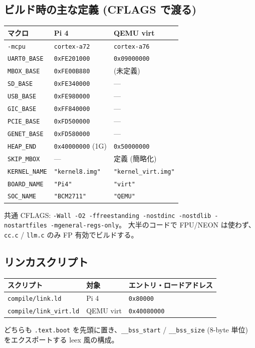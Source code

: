 \documentclass[a4paper,11pt]{ltjsarticle}
\begin{document}
\subsection{ビルド時の主な定義 (CFLAGS で渡る)}
\begin{center}\footnotesize
\begin{tabular}{@{}l l l@{}}
\toprule
\textbf{マクロ} & \textbf{Pi 4} & \textbf{QEMU virt}\\
\midrule
\verb|-mcpu|       & \verb|cortex-a72| & \verb|cortex-a76|\\
\verb|UART0_BASE|  & \verb|0xFE201000| & \verb|0x09000000|\\
\verb|MBOX_BASE|   & \verb|0xFE00B880| & (未定義)\\
\verb|SD_BASE|     & \verb|0xFE340000| & ---\\
\verb|USB_BASE|    & \verb|0xFE980000| & ---\\
\verb|GIC_BASE|    & \verb|0xFF840000| & ---\\
\verb|PCIE_BASE|   & \verb|0xFD500000| & ---\\
\verb|GENET_BASE|  & \verb|0xFD580000| & ---\\
\verb|HEAP_END|    & \verb|0x40000000| (1G) & \verb|0x50000000|\\
\verb|SKIP_MBOX|   & ---               & 定義 (簡略化)\\
\verb|KERNEL_NAME| & \verb|"kernel8.img"| & \verb|"kernel_virt.img"|\\
\verb|BOARD_NAME|  & \verb|"Pi4"|      & \verb|"virt"|\\
\verb|SOC_NAME|    & \verb|"BCM2711"|  & \verb|"QEMU"|\\
\bottomrule
\end{tabular}
\end{center}

共通 CFLAGS:
\verb|-Wall -O2 -ffreestanding -nostdinc -nostdlib -nostartfiles -mgeneral-regs-only|。
大半のコードで FPU/NEON は使わず、\verb|cc.c| / \verb|llm.c| のみ FP 有効でビルドする。

\subsection{リンカスクリプト}
\begin{center}\footnotesize
\begin{tabular}{@{}l l l@{}}
\toprule
\textbf{スクリプト} & \textbf{対象} & \textbf{エントリ・ロードアドレス}\\
\midrule
\verb|compile/link.ld|      & Pi 4      & \verb|0x80000|\\
\verb|compile/link_virt.ld| & QEMU virt & \verb|0x40080000|\\
\bottomrule
\end{tabular}
\end{center}
どちらも \verb|.text.boot| を先頭に置き、\verb|__bss_start| / \verb|__bss_size|
(8-byte 単位) をエクスポートする leex 風の構成。
\end{document}
